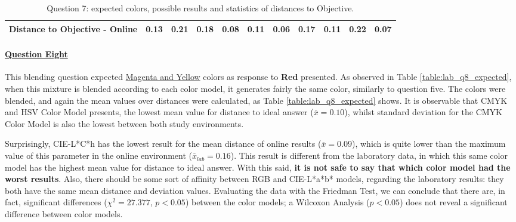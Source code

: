\begin{table}[H]
{\begin{tabular}{lccccccccccccc}
    \multicolumn{4}{l}{Distance to Objective - Online}                                                                                               & \multicolumn{1}{|c}{0.13}        & \multicolumn{1}{c|}{0.21}    & \multicolumn{1}{|c}{0.18}        & \multicolumn{1}{c|}{0.08}    & \multicolumn{1}{|c}{\textbf{0.11}}       & \multicolumn{1}{c|}{0.06}    & \multicolumn{1}{|c}{0.17}        & \multicolumn{1}{c|}{0.11}    & \multicolumn{1}{|c}{0.22}       & \multicolumn{1}{c|}{0.07}    \\ \hline
    \end{tabular}}
  \caption[Question 7, with expected Results.]{Question 7: expected colors, possible results and statistics of distances to Objective.}
  \label{table:lab_q7_expected}
\end{table}
%
\paragraph{\ul{Question Eight}}
%
This blending question expected \ul{Magenta and Yellow} colors as response to \textbf{Red} presented. As observed in Table \ref{table:lab_q8_expected}, when this mixture is blended according
to each color model, it generates fairly the same color, similarly to question five.
The colors were blended, and again the mean values over distances were calculated, as Table \ref{table:lab_q8_expected} shows. It is observable that CMYK and HSV Color Model presents,
the lowest mean value for distance to ideal answer ($\overline{x} = 0.10$), whilst standard deviation for the CMYK Color Model is also the lowest between both study environments. \par
%
Surprisingly, CIE-L*C*h has the lowest result for the mean distance of online results ($\overline{x} = 0.09$), which is quite lower than the maximum value of this parameter in the online
environment ($\overline{x}_{lab} = 0.16$). This result is different from the laboratory data, in which this same color model has the highest mean value for distance to ideal answer. With
this said, \textbf{it is not safe to say that which color model had the worst results}.
Also, there should be some sort of affinity between RGB and CIE-L*a*b* models, regarding the laboratory results: they both have the same mean distance and deviation values.
Evaluating the data with the Friedman Test, we can conclude that there are, in fact, significant differences ($\chi^2 = 27.377$, $p < 0.05$) between the color models; a Wilcoxon Analysis
($p < 0.05$) does not reveal a significant difference between color models. \par
